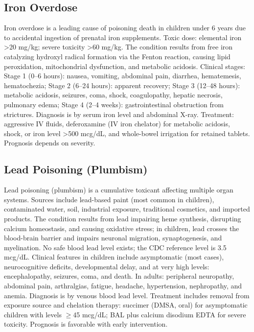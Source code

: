 \subsection{Iron Overdose}
\label{sec:Iron Overdose}
Iron overdose is a leading cause of poisoning death in children under 6 years due to accidental ingestion of prenatal iron supplements. Toxic dose: elemental iron >20 mg/kg; severe toxicity >60 mg/kg. The condition results from free iron catalyzing hydroxyl radical formation via the Fenton reaction, causing lipid peroxidation, mitochondrial dysfunction, and metabolic acidosis. Clinical stages: Stage 1 (0--6 hours): nausea, vomiting, abdominal pain, diarrhea, hematemesis, hematochezia; Stage 2 (6--24 hours): apparent recovery; Stage 3 (12--48 hours): metabolic acidosis, seizures, coma, shock, coagulopathy, hepatic necrosis, pulmonary edema; Stage 4 (2--4 weeks): gastrointestinal obstruction from strictures. Diagnosis is by serum iron level and abdominal X-ray. Treatment: aggressive IV fluids, deferoxamine (IV iron chelator) for metabolic acidosis, shock, or iron level >500 mcg/dL, and whole-bowel irrigation for retained tablets. Prognosis depends on severity.

\subsection{Lead Poisoning (Plumbism)}
\label{sec:Lead Poisoning}
Lead poisoning (plumbism) is a cumulative toxicant affecting multiple organ systems. Sources include lead-based paint (most common in children), contaminated water, soil, industrial exposure, traditional cosmetics, and imported products. The condition results from lead impairing heme synthesis, disrupting calcium homeostasis, and causing oxidative stress; in children, lead crosses the blood-brain barrier and impairs neuronal migration, synaptogenesis, and myelination. No safe blood lead level exists; the CDC reference level is 3.5 mcg/dL. Clinical features in children include asymptomatic (most cases), neurocognitive deficits, developmental delay, and at very high levels: encephalopathy, seizures, coma, and death. In adults: peripheral neuropathy, abdominal pain, arthralgias, fatigue, headache, hypertension, nephropathy, and anemia. Diagnosis is by venous blood lead level. Treatment includes removal from exposure source and chelation therapy: succimer (DMSA, oral) for asymptomatic children with levels $\ge$45 mcg/dL; BAL plus calcium disodium EDTA for severe toxicity. Prognosis is favorable with early intervention.

